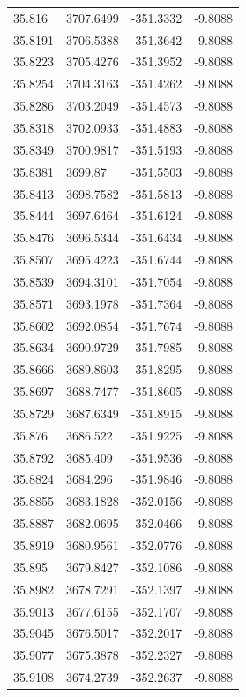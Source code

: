 \begin{table}[H]
\begin{tabular}{llll}
35.816 & 3707.6499 & -351.3332 & -9.8088 \\
35.8191 & 3706.5388 & -351.3642 & -9.8088 \\
35.8223 & 3705.4276 & -351.3952 & -9.8088 \\
35.8254 & 3704.3163 & -351.4262 & -9.8088 \\
35.8286 & 3703.2049 & -351.4573 & -9.8088 \\
35.8318 & 3702.0933 & -351.4883 & -9.8088 \\
35.8349 & 3700.9817 & -351.5193 & -9.8088 \\
35.8381 & 3699.87 & -351.5503 & -9.8088 \\
35.8413 & 3698.7582 & -351.5813 & -9.8088 \\
35.8444 & 3697.6464 & -351.6124 & -9.8088 \\
35.8476 & 3696.5344 & -351.6434 & -9.8088 \\
35.8507 & 3695.4223 & -351.6744 & -9.8088 \\
35.8539 & 3694.3101 & -351.7054 & -9.8088 \\
35.8571 & 3693.1978 & -351.7364 & -9.8088 \\
35.8602 & 3692.0854 & -351.7674 & -9.8088 \\
35.8634 & 3690.9729 & -351.7985 & -9.8088 \\
35.8666 & 3689.8603 & -351.8295 & -9.8088 \\
35.8697 & 3688.7477 & -351.8605 & -9.8088 \\
35.8729 & 3687.6349 & -351.8915 & -9.8088 \\
35.876 & 3686.522 & -351.9225 & -9.8088 \\
35.8792 & 3685.409 & -351.9536 & -9.8088 \\
35.8824 & 3684.296 & -351.9846 & -9.8088 \\
35.8855 & 3683.1828 & -352.0156 & -9.8088 \\
35.8887 & 3682.0695 & -352.0466 & -9.8088 \\
35.8919 & 3680.9561 & -352.0776 & -9.8088 \\
35.895 & 3679.8427 & -352.1086 & -9.8088 \\
35.8982 & 3678.7291 & -352.1397 & -9.8088 \\
35.9013 & 3677.6155 & -352.1707 & -9.8088 \\
35.9045 & 3676.5017 & -352.2017 & -9.8088 \\
35.9077 & 3675.3878 & -352.2327 & -9.8088 \\
35.9108 & 3674.2739 & -352.2637 & -9.8088 \\

\end{tabular}
\end{table}
